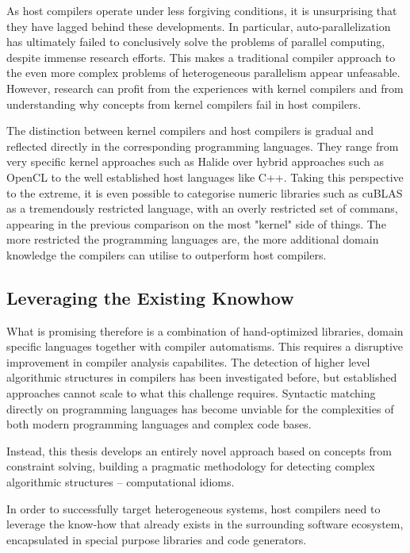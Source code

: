     As host compilers operate under less forgiving conditions, it is
    unsurprising that they have lagged behind these developments.
    In particular, auto-parallelization has ultimately failed to conclusively
    solve the problems of parallel computing, despite immense research efforts.
    This makes a traditional compiler approach to the even more complex
    problems of heterogeneous parallelism appear unfeasable.
    However, research can profit from the experiences with kernel compilers
    and from understanding why concepts from kernel compilers fail in
    host compilers.

    The distinction between kernel compilers and host compilers is gradual and
    reflected directly in the corresponding programming languages.
    They range from very specific kernel approaches such as Halide over hybrid
    approaches such as OpenCL to the well established host languages like C++.
    Taking this perspective to the extreme, it is even possible to categorise
    numeric libraries such as cuBLAS as a tremendously restricted language, with
    an overly restricted set of commans, appearing in the previous comparison
    on the most "kernel" side of things.
    The more restricted the programming languages are, the more additional
    domain knowledge the compilers can utilise to outperform host compilers.

    \subsection*{Leveraging the Existing Knowhow}


    What is promising therefore is a combination of hand-optimized libraries,
    domain specific languages together with compiler automatisms.
    This requires a disruptive improvement in compiler analysis capabilites.
    The detection of higher level algorithmic structures in compilers has been
    investigated before, but established approaches cannot scale to what
    this challenge requires.
    Syntactic matching directly on programming languages has become
    unviable for the complexities of both modern programming languages and
    complex code bases.

    Instead, this thesis develops an entirely novel approach based on concepts
    from constraint solving, building a pragmatic methodology for detecting
    complex algorithmic structures -- computational idioms.


    In order to successfully target heterogeneous systems, host compilers need
    to leverage the know-how that already exists in the surrounding software
    ecosystem, encapsulated in special purpose libraries and code generators.

